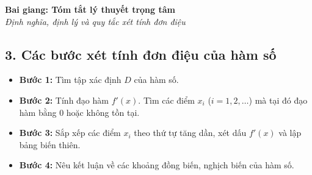 \documentclass[12pt,a4paper]{article}
\newenvironment{lesson}[2]{\vspace{1em}\noindent\textbf{\Large Bai giang: #1}\\\textit{#2}\par}{}
\begin{document}
\begin{lesson}{Tóm tắt lý thuyết trọng tâm}{Định nghĩa, định lý và quy tắc xét tính đơn điệu}
\subsection{3. Các bước xét tính đơn điệu của hàm số}
\begin{itemize}
    \item \textbf{Bước 1:} Tìm tập xác định $D$ của hàm số.
    \item \textbf{Bước 2:} Tính đạo hàm $f'(x)$. Tìm các điểm $x_i$ ($i = 1, 2, \dots$) mà tại đó đạo hàm bằng $0$ hoặc không tồn tại.
    \item \textbf{Bước 3:} Sắp xếp các điểm $x_i$ theo thứ tự tăng dần, xét dấu $f'(x)$ và lập bảng biến thiên.
    \item \textbf{Bước 4:} Nêu kết luận về các khoảng đồng biến, nghịch biến của hàm số.
\end{itemize}
\end{lesson}
\end{document}
